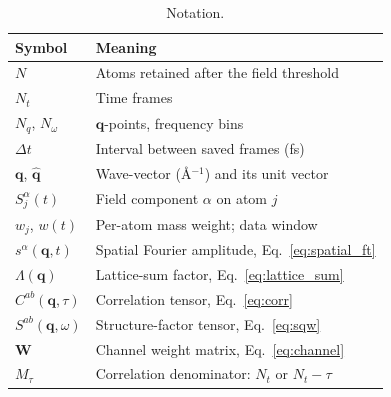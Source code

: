 \documentclass[12pt, a4paper, oneside]{article}
\newcommand{\qvec}{\mathbf{q}}
\newcommand{\qhat}{\hat{\mathbf{q}}}
\newcommand{\Nt}{N_t}
\newcommand{\Na}{N}
\newcommand{\Nq}{N_q}
\newcommand{\Nw}{N_\omega}
\newcommand{\field}{S}
\newcommand{\Wmat}{\mathbf{W}}
\begin{document}
\begin{table}[h]
    \centering
    \begin{tabular}{ll}
        \toprule
        Symbol & Meaning \\
        \midrule
        $\Na$ & Atoms retained after the field threshold \\
        $\Nt$ & Time frames \\
        $\Nq$, $\Nw$ & $\qvec$-points, frequency bins \\
        $\Delta t$ & Interval between saved frames (fs) \\
        $\qvec$, $\qhat$ & Wave-vector (\AA$^{-1}$) and its unit vector \\
        $\field_j^\alpha(t)$ & Field component $\alpha$ on atom $j$ \\
        $w_j$, $w(t)$ & Per-atom mass weight; data window \\
        $s^\alpha(\qvec,t)$ & Spatial Fourier amplitude, Eq.~\eqref{eq:spatial_ft} \\
        $\Lambda(\qvec)$ & Lattice-sum factor, Eq.~\eqref{eq:lattice_sum} \\
        $C^{ab}(\qvec,\tau)$ & Correlation tensor, Eq.~\eqref{eq:corr} \\
        $S^{ab}(\qvec,\omega)$ & Structure-factor tensor, Eq.~\eqref{eq:sqw} \\
        $\Wmat$ & Channel weight matrix, Eq.~\eqref{eq:channel} \\
        $M_\tau$ & Correlation denominator: $\Nt$ or $\Nt-\tau$ \\
        \bottomrule
    \end{tabular}
    \caption{Notation.}
\end{table}
\end{document}
